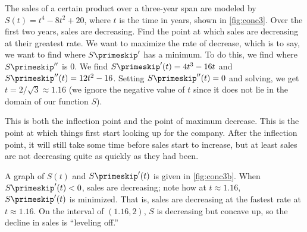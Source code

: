 \begin{example}\label{ex_conc3}
The sales of a certain product over a three-year span are modeled by $S(t)= t^4-8t^2+20$, where $t$ is the time in years, shown in \autoref{fig:conc3}.  Over the first two years, sales are decreasing.  Find the point at which sales are decreasing at their greatest rate.
\solution
We want to maximize the rate of decrease, which is to say, we want to find where $S\primeskip'$ has a minimum.  To do this, we find where $S\primeskip''$ is 0.  We find $S\primeskip'(t)=4t^3-16t$ and $S\primeskip''(t)=12t^2-16$.  Setting $S\primeskip''(t)=0$ and solving, we get $t=2/\sqrt3\approx 1.16$ (we ignore the negative value of $t$ since it does not lie in the domain of our function $S$).


\begin{center}
\end{center}

This is both the inflection point and the point of maximum decrease.  This is the point at which things first start looking up for the company.  After the inflection point, it will still take some time before sales start to increase, but at least sales are not decreasing quite as quickly as they had been.

A graph of $S(t)$ and $S\primeskip'(t)$ is given in \autoref{fig:conc3b}. When $S\primeskip'(t)<0$, sales are decreasing; note how at $t\approx 1.16$, $S\primeskip'(t)$ is minimized. That is, sales are decreasing at the fastest rate at $t\approx 1.16$.  On the interval of $(1.16,2)$, $S$ is decreasing but concave up, so the decline in sales is ``leveling off.''
\end{example}

